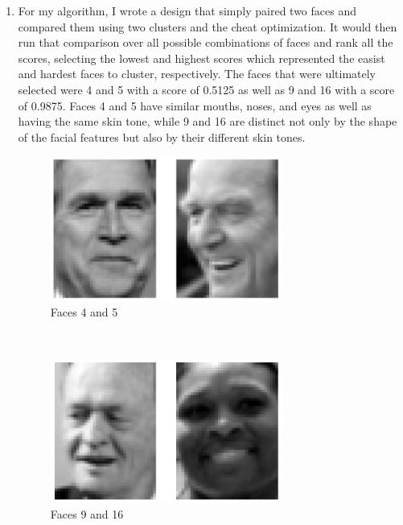 \documentclass[11pt]{article}
\newcommand{\solution}[1]{{{\color{blue}{\bf Solution:} {#1}}}}
\begin{document}
\begin{enumerate}
\item
\solution{
For my algorithm, I wrote a design that simply paired two faces and compared them using two clusters and the cheat optimization. It would then run that comparison over all possible combinations of faces and rank all the scores, selecting the lowest and highest scores which represented the easist and hardest faces to cluster, respectively. The faces that were ultimately selected were 4 and 5 with a score of 0.5125 as well as 9 and 16 with a score of 0.9875. Faces 4 and 5 have similar mouths, noses, and eyes as well as having the same skin tone, while 9 and 16 are distinct not only by the shape of the facial features but also by their different skin tones.
\begin{figure}[!htbp]
    \centering
    \includegraphics[width=3in]{45.png}
    \caption{Faces 4 and 5} 
\end{figure} \\
\begin{figure}[!htbp]
    \centering
    \includegraphics[width=3in]{916.png}
    \caption{Faces 9 and 16} 
\end{figure} \\
}
\end{enumerate}
\end{document}

